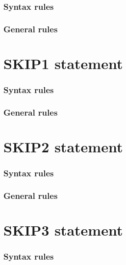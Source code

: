\subsubsection{Syntax rules}

\subsubsection{General rules}

\section{SKIP1 statement}

\begin{syntax}
\end{syntax}

\subsubsection{Syntax rules}

\subsubsection{General rules}

\section{SKIP2 statement}

\begin{syntax}
\end{syntax}

\subsubsection{Syntax rules}

\subsubsection{General rules}

\section{SKIP3 statement}

\begin{syntax}
\end{syntax}

\subsubsection{Syntax rules}

